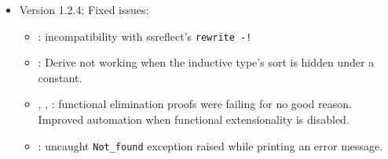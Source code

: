\begin{itemize}
\item Version 1.2.4:
  Fixed issues:
  \begin{itemize}
    \item {}: incompatibility with ssreflect's \texttt{rewrite -!}
    \item {}: Derive not working when the inductive type's sort is hidden under a constant.
    \item {}, , : functional elimination proofs were failing for no good reason.
      Improved automation when functional extensionality is disabled.
    \item {}: uncaught \texttt{Not\_found} exception raised while printing an error message.
  \end{itemize}
\end{itemize}


